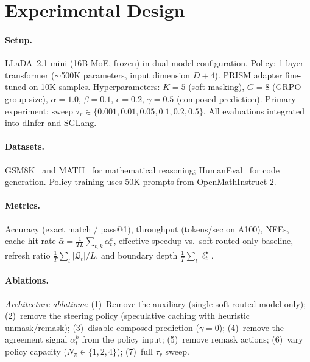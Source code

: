 \documentclass[11pt]{article}
\newcommand{\cQ}{\mathcal{Q}}
\begin{document}
\section{Experimental Design}
\label{sec:experiments}

\paragraph{Setup.}
LLaDA~2.1-mini (16B MoE, frozen) in dual-model configuration.
Policy: 1-layer transformer (${\sim}$500K parameters, input dimension $D{+}4$).
PRISM adapter fine-tuned on 10K samples.
Hyperparameters: $K{=}5$ (soft-masking), $G{=}8$ (GRPO group size), $\alpha{=}1.0$, $\beta{=}0.1$, $\epsilon{=}0.2$, $\gamma{=}0.5$ (composed prediction).
Primary experiment: sweep $\tau_r \in \{0.001, 0.01, 0.05, 0.1, 0.2, 0.5\}$.
All evaluations integrated into dInfer and SGLang.

\paragraph{Datasets.}
GSM8K~\cite{cobbe2021gsm8k} and MATH~\cite{hendrycks2021math} for mathematical reasoning; HumanEval~\cite{chen2021humaneval} for code generation.
Policy training uses 50K prompts from OpenMathInstruct-2.

\paragraph{Metrics.}
Accuracy (exact match / pass@1), throughput (tokens/sec on A100), NFEs, cache hit rate $\bar{\alpha} = \frac{1}{TL}\sum_{t,k} \alpha_t^k$, effective speedup vs.\ soft-routed-only baseline, refresh ratio $\frac{1}{T}\sum_t |\cQ_t|/L$, and boundary depth $\frac{1}{T}\sum_t \ell_t^\star$.

\paragraph{Ablations.} 
\emph{Architecture ablations:}
(1)~Remove the auxiliary (single soft-routed model only);
(2)~remove the steering policy (speculative caching with heuristic unmask/remask);
(3)~disable composed prediction ($\gamma = 0$);
(4)~remove the agreement signal $\alpha_t^k$ from the policy input;
(5)~remove remask actions;
(6)~vary policy capacity ($N_\pi \in \{1, 2, 4\}$);
(7)~full $\tau_r$ sweep.
\end{document}
